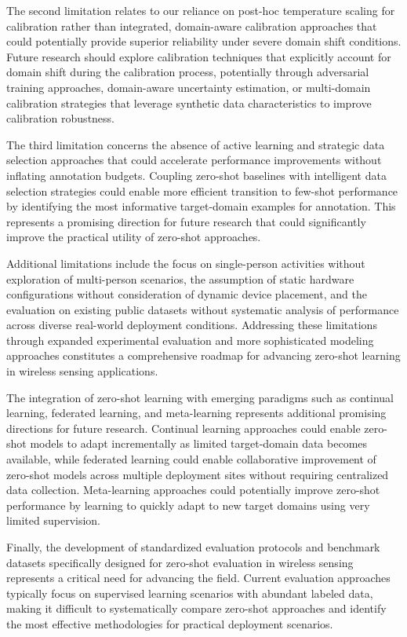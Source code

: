 \documentclass[journal]{IEEEtran}
\begin{document}
The second limitation relates to our reliance on post-hoc temperature scaling for calibration rather than integrated, domain-aware calibration approaches that could potentially provide superior reliability under severe domain shift conditions. Future research should explore calibration techniques that explicitly account for domain shift during the calibration process, potentially through adversarial training approaches, domain-aware uncertainty estimation, or multi-domain calibration strategies that leverage synthetic data characteristics to improve calibration robustness.

The third limitation concerns the absence of active learning and strategic data selection approaches that could accelerate performance improvements without inflating annotation budgets. Coupling zero-shot baselines with intelligent data selection strategies could enable more efficient transition to few-shot performance by identifying the most informative target-domain examples for annotation. This represents a promising direction for future research that could significantly improve the practical utility of zero-shot approaches.

Additional limitations include the focus on single-person activities without exploration of multi-person scenarios, the assumption of static hardware configurations without consideration of dynamic device placement, and the evaluation on existing public datasets without systematic analysis of performance across diverse real-world deployment conditions. Addressing these limitations through expanded experimental evaluation and more sophisticated modeling approaches constitutes a comprehensive roadmap for advancing zero-shot learning in wireless sensing applications.

The integration of zero-shot learning with emerging paradigms such as continual learning, federated learning, and meta-learning represents additional promising directions for future research. Continual learning approaches could enable zero-shot models to adapt incrementally as limited target-domain data becomes available, while federated learning could enable collaborative improvement of zero-shot models across multiple deployment sites without requiring centralized data collection. Meta-learning approaches could potentially improve zero-shot performance by learning to quickly adapt to new target domains using very limited supervision.

Finally, the development of standardized evaluation protocols and benchmark datasets specifically designed for zero-shot evaluation in wireless sensing represents a critical need for advancing the field. Current evaluation approaches typically focus on supervised learning scenarios with abundant labeled data, making it difficult to systematically compare zero-shot approaches and identify the most effective methodologies for practical deployment scenarios.
\end{document}
